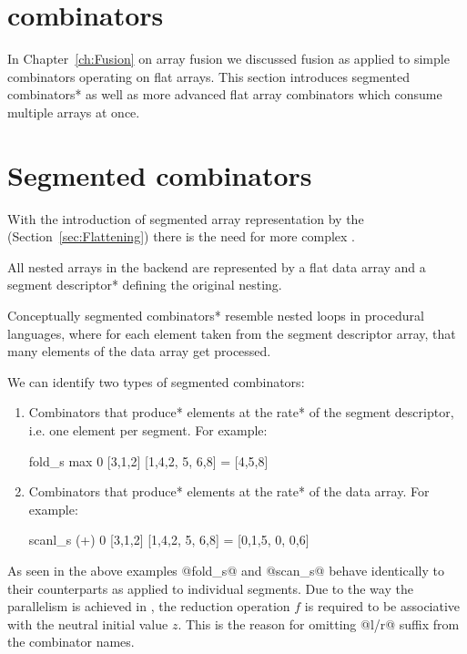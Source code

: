\documentclass[preamble.tex]{subfiles}
\begin{document}
\clearpage

\section{\DPH combinators}
\label{sec:DPH-Combinators}

In Chapter~\ref{ch:Fusion} on array fusion we discussed fusion as applied to simple combinators operating on flat arrays. This section introduces \*segmented combinators* as well as more advanced flat array combinators which consume multiple arrays at once.


\section{Segmented combinators}
\label{sec:DPH-segmented-combinators}

With the introduction of segmented array representation by the  (Section~\ref{sec:Flattening}) there is the need for more complex .\isegcomb

All nested arrays in the \DPH backend are represented by a flat data array and a \*segment descriptor* defining the original nesting.

Conceptually \*segmented combinators* resemble nested loops in procedural languages, where for each element taken from the segment descriptor array, that many elements of the data array get processed.

We can identify two types of segmented combinators:

\begin{enumerate}
\item Combinators that \*produce* elements at the \*rate* of the segment descriptor, i.e. one element per segment. For example:

\begin{hscode}
fold_s max 0 [3,1,2] [1,4,2, 5, 6,8] = [4,5,8]
\end{hscode}

\item Combinators that \*produce* elements at the \*rate* of the data array. For example:

\begin{hscode}
scanl_s (+) 0 [3,1,2] [1,4,2, 5, 6,8] = [0,1,5, 0, 0,6]
\end{hscode}
\end{enumerate}

As seen in the above examples @fold_s@ and @scan_s@ behave identically to their  counterparts as applied to individual segments. Due to the way the parallelism is achieved in \DPH, the reduction operation $f$ is required to be associative with the neutral initial value $z$. This is the reason for omitting @l/r@ suffix from the combinator names.
\end{document}
